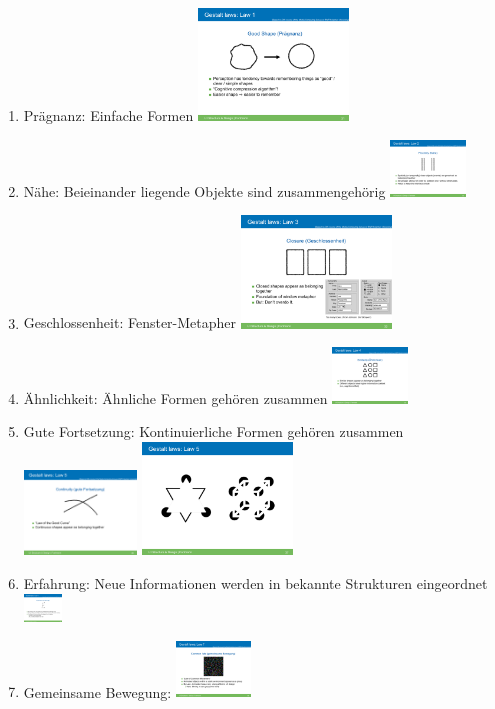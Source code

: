 \documentclass[a4paper,10pt]{article}
\begin{document}
\begin{enumerate}
	\item Prägnanz: Einfache Formen
	\includegraphics[width=4cm]{inc/gestalt_1.pdf}
	\item Nähe: Beieinander liegende Objekte sind zusammengehörig
	\includegraphics[width=2cm]{inc/gestalt_2.pdf}
	\item Geschlossenheit: Fenster-Metapher
	\includegraphics[width=4cm]{inc/gestalt_3.pdf}
	\item Ähnlichkeit: Ähnliche Formen gehören zusammen
	\includegraphics[width=2cm]{inc/gestalt_4.pdf}
	\item Gute Fortsetzung: Kontinuierliche Formen gehören zusammen
	\includegraphics[width=3cm]{inc/gestalt_5_1.pdf}
	\includegraphics[width=4cm]{inc/gestalt_5_2.pdf}
	\item Erfahrung: Neue Informationen werden in bekannte Strukturen eingeordnet
	\includegraphics[width=1cm]{inc/gestalt_6.pdf}
	\item Gemeinsame Bewegung:
	\includegraphics[width=2cm]{inc/gestalt_7.pdf}
\end{enumerate}
\end{document}
